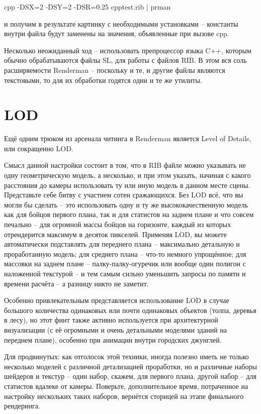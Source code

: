 cpp  -DSX=2
    -DSY=2
    -DSR=0.25 cpptest.rib  | prman
  

 и получим в
    результате картинку с необходимыми установками – константы внутри
    файла будут заменены на значения, объявленные при вызове
    cpp.
  

 Несколько
    неожиданный ход – использовать препроцессор языка C++, которым
    обычно обрабатываются файлы SL, для работы с файлов RIB. В этом вся
    соль расширяемости Renderman – поскольку и те, и другие файлы
    являются текстовыми, то для их обработки годятся одни и те же
    утилиты.

  \section*{LOD}
  

 Ещё одним трюком из арсенала читинга в Renderman
    является Level of Details, или сокращенно LOD.
  

 Смысл данной настройки состоит в том, что в RIB
    файле можно указывать не одну геометрическую модель, а несколько, и
    при этом указать, начиная с какого расстояния до камеры
    использовать ту или иную модель в данном месте сцены. Представьте
    себе битву с участием сотен сражающихся. Без LOD всё, что вы могли
    бы сделать – это использовать одну и ту же высококачественную
    модель как для бойцов первого плана, так и для статистов на заднем
    плане и что совсем печально – для огромной массы бойцов на
    горизонте, каждый из которых отрендерится максимум в десяток
    пикселей. Применяя LOD, вы можете автоматически подставлять для
    переднего плана – максимально детальную и проработанную модель; для
    среднего плана – что-то немного упрощённое; для массовки на заднем
    плане – палку-палку-огуречик или вообще один полигон с наложенной
    текстурой – и тем самым сильно уменьшить запросы по памяти и
    времени расчёта – а разницу никто не заметит.
  

 Особенно привлекательным представляется
    использование LOD в случае большого количества одинаковых или почти
    одинаковых объектов (толпа, деревья в лесу), но этот финт также
    активно используется при архитектурной визуализации (с её огромными
    и очень детальными моделями зданий на переднем плане), особенно при
    анимации внутри городских джунглей.
  

 Для
    продвинутых: как отголосок этой
    техники, иногда полезно иметь не только несколько моделей с
    различной детализацией проработки, но и различные наборы шейдеров и
    текстур – один набор, скажем, для первого плана, другой набор – для
    статистов вдалеке от камеры. Поверьте, дополнительное время,
    потраченное на настройку нескольких таких наборов, вернётся
    сторицей на этапе финального рендеринга.
  
